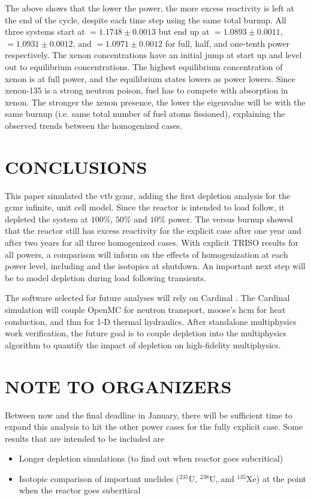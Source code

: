 \documentclass[letterpaper]{physor2024}
\begin{document}
The above shows that the lower the power, the more excess reactivity is left at the end of the cycle, despite each time step using the same total burnup. All three systems start at \kinf$=1.1748 \pm 0.0013 $ but end up at \kinf$=1.0893 \pm 0.0011 $, \kinf$=1.0931 \pm 0.0012$, and \kinf$=1.0971 \pm 0.0012$ for full, half, and one-tenth power respectively. The xenon concentrations have an initial jump at start up and level out to equilibrium concentrations. The highest equilibrium concentration of xenon is at full power, and the equilibrium states lowers as power lowers. Since xenon-135 is a strong neutron poison, fuel has to compete with absorption in xenon. The stronger the xenon presence, the lower the eigenvalue will be with the same burnup (i.e. same total number of fuel atoms fissioned), explaining the observed trends between the homogenized cases.

\section{CONCLUSIONS}\label{sec:conclusions}
This paper simulated the \gls{vtb} \gls{gcmr}, adding the first depletion analysis for the \gls{gcmr} infinite, unit cell model. Since the reactor is intended to load follow, it depleted the system at $100\%$, $50\%$ and $10\%$ power. The \kinf versus burnup showed that the reactor still has excess reactivity for the explicit case after one year and after two years for all three homogenized cases. With explicit TRISO results for all powers, a comparison will inform on the effects of homogenization at each power level, including \kinf and the isotopics at shutdown. An important next step will be to model depletion during load following transients.

The software selected for future analyses will rely on Cardinal \cite{novak2022-cardinal}. The Cardinal simulation will couple OpenMC for neutron transport, \gls{moose}'s \gls{hcm} for heat conduction, and \gls{thm} for 1-D thermal hydraulics. After standalone multiphysics work verification, the future goal is to couple depletion into the multiphysics algorithm to quantify the impact of depletion on high-fidelity multiphysics.

\section*{NOTE TO ORGANIZERS}
Between now and the final deadline in January, there will be sufficient time to expand this analysis to hit the other power cases for the fully explicit case. Some results that are intended to be included are
\begin{itemize}
    \item Longer depletion simulations (to find out when reactor goes subcritical)
    \item Isotopic comparison of important nuclides ($^{235}$U, $^{238}$U, and $^{135}$Xe) at the point when the reactor goes subcritical
\end{itemize}
\end{document}
